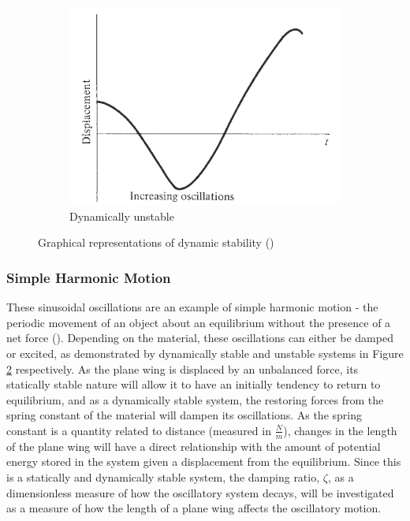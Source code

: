 \documentclass[12pt]{article}
\begin{document}
\begin{figure}[h]
\begin{subfigure}[b]{0.3\textwidth}
     \end{subfigure}
     \hfill
     \begin{subfigure}[b]{0.3\textwidth}
         \centering
         \includegraphics[width=\textwidth]{images/d unstable.png}
         \caption{Dynamically unstable}
         \label{fig:d.unstable}
     \end{subfigure}
     \hfill
        \caption{Graphical representations of dynamic stability (\citeauthor{anderson_bowden_2022})}
        \label{fig:dynamic.stability}
\end{figure}


\subsubsection{Simple Harmonic Motion}
These sinusoidal oscillations are an example of simple harmonic motion - the periodic movement of an object about an equilibrium without the presence of a net force (\citeauthor{britannica_2023}). Depending on the material, these oscillations can either be damped or excited, as demonstrated by dynamically stable and unstable systems in Figure \ref{fig:dynamic.stability} respectively. As the plane wing is displaced by an unbalanced force, its statically stable nature will allow it to have an initially tendency to return to equilibrium, and as a dynamically stable system, the restoring forces from the spring constant of the material will dampen its oscillations. As the spring constant is a quantity related to distance (measured in $\frac{N}{m}$), changes in the length of the plane wing will have a direct relationship with the amount of potential energy stored in the system given a displacement from the equilibrium. Since this is a statically and dynamically stable system, the damping ratio, $\zeta$, as a dimensionless measure of how the oscillatory system decays, will be investigated as a measure of how the length of a plane wing affects the oscillatory motion. 
\end{document}

